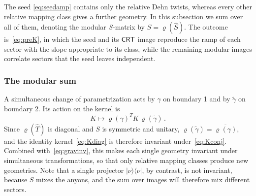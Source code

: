 \documentclass[11pt]{article}
\numberwithin{equation}{section}
\newcommand{\vr}{\varrho}
\begin{document}
The seed \eqref{eq:seedamp} contains only the relative Dehn twists, whereas every other relative mapping class gives a further geometry. In this subsection we sum over all of them, denoting the modular $S$-matrix by $S=\vr(\hat S)$. The outcome is~\eqref{eq:preK}, in which the seed and its $\mathsf{CRT}$ image reproduce the ramp of each sector with the slope appropriate to its class, while the remaining modular images correlate sectors that the seed leaves independent.

\subsubsection{The modular sum}\label{sec:completion}

A simultaneous change of parametrization acts by $\gamma$ on boundary 1 and by $\tilde\gamma$ on boundary 2. Its action on the kernel is
\begin{equation}\label{eq:Kconj}
K\longmapsto\vr(\gamma)^{T}K\,\vr(\tilde\gamma)\,.
\end{equation}
Since $\vr(\hat T)$ is diagonal and $S$ is symmetric and unitary, $\vr(\tilde\gamma)=\overline{\vr(\gamma)}$, and the identity kernel~\eqref{eq:Kdiag} is therefore invariant under~\eqref{eq:Kconj}. Combined with~\eqref{eq:gravinv}, this makes each single geometry invariant under simultaneous transformations, so that only relative mapping classes produce new geometries. Note that a single projector $|\nu\rangle\langle\nu|$, by contrast, is not invariant, because $S$ mixes the anyons, and the sum over images will therefore mix different sectors.
\end{document}
